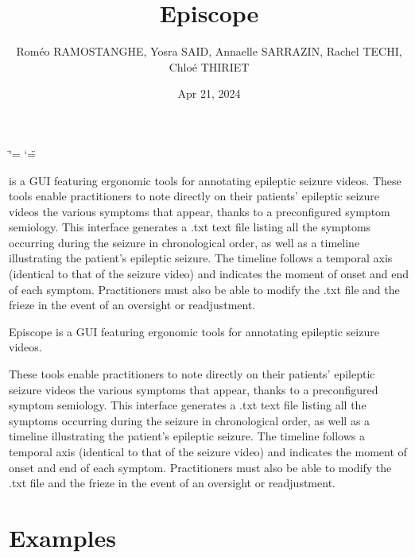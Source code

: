\documentclass[letterpaper,10pt,english]{sphinxmanual}
\title{Episcope}
\date{Apr 21, 2024}
\author{Roméo RAMOS\sphinxhyphen{}\sphinxhyphen{}TANGHE, Yosra SAID, Annaelle SARRAZIN, Rachel TECHI, Chloé THIRIET}
\let\sphinxpxdimen\pdfpxdimen\else\newdimen\sphinxpxdimen
\begin{document}
\ifdefined\shorthandoff
  \ifnum\catcode`\=\string=\active\shorthandoff{=}\fi
  \ifnum\catcode`\"=\active{}\fi
\fi

\pagestyle{empty}
\sphinxmaketitle
\pagestyle{plain}
\sphinxtableofcontents
\pagestyle{normal}
\label{\detokenize{index::doc}}
\noindent{\hspace*{\fill}\sphinxincludegraphics[width=500\sphinxpxdimen,height=110\sphinxpxdimen]{{Logo_final}.png}\hspace*{\fill}}

\sphinxAtStartPar
{} is a GUI featuring ergonomic tools for annotating epileptic seizure videos.
These tools enable practitioners to note directly on their patients’ epileptic seizure videos the various symptoms that appear, thanks to a pre\sphinxhyphen{}configured symptom semiology. This interface generates a .txt text file listing all the symptoms occurring during the seizure in chronological order, as well as a timeline illustrating the patient’s epileptic seizure. The timeline follows a temporal axis (identical to that of the seizure video) and indicates the moment of onset and end of each symptom. Practitioners must also be able to modify the .txt file and the frieze in the event of an oversight or readjustment.

\sphinxstepscope



\sphinxAtStartPar
Episcope is a GUI featuring ergonomic tools for annotating epileptic seizure videos.

\sphinxAtStartPar
These tools enable practitioners to note directly on their patients’ epileptic seizure videos the various symptoms that appear, thanks to a pre\sphinxhyphen{}configured symptom semiology.
This interface generates a .txt text file listing all the symptoms occurring during the seizure in chronological order, as well as a timeline illustrating the patient’s
epileptic seizure. The timeline follows a temporal axis (identical to that of the seizure video) and indicates the moment of onset and end of each symptom. Practitioners must
also be able to modify the .txt file and the frieze in the event of an oversight or readjustment.


\chapter{Examples}
\label{\detokenize{GUI:examples}}
\noindent{\hspace*{\fill}\sphinxincludegraphics[width=500\sphinxpxdimen,height=110\sphinxpxdimen]{{interface_vide}.png}\hspace*{\fill}}
\end{document}
